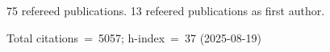 75 refereed publications. 13 refeered publications as first author.

Total citations~=~5057; h-index~=~37 (2025-08-19)